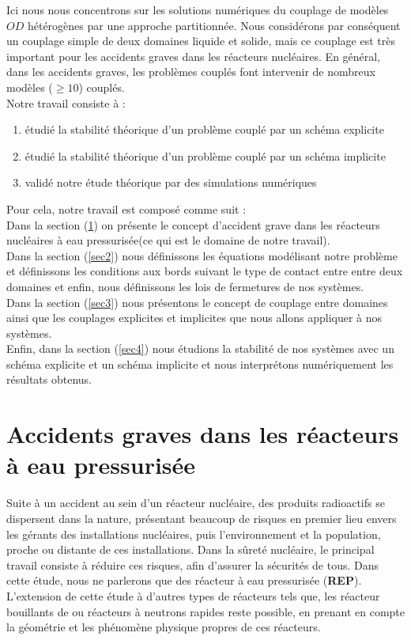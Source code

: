 \documentclass[11pt,a4paper]{scrartcl}%
\begin{document}
	Ici nous nous concentrons sur les solutions numériques du couplage de modèles $OD$ hétérogènes par une approche partitionnée.  Nous considérons par conséquent un couplage simple de deux domaines liquide et solide, mais ce couplage est très important pour les accidents graves dans les réacteurs nucléaires. En général, dans les accidents graves, les problèmes couplés font intervenir de nombreux modèles ($\geq 10$) couplés.\\
	Notre travail consiste à :
	\begin{enumerate}
		\item étudié la stabilité théorique d'un problème couplé par un schéma explicite
		\item étudié la stabilité théorique d'un problème couplé par un schéma implicite
		\item validé notre étude théorique par des simulations numériques
	\end{enumerate}
	Pour cela, notre travail est composé comme suit :\\
	Dans la section (\ref{sec1}) on présente le concept d'accident grave dans les réacteurs nucléaires à eau pressurisée(ce qui est le domaine de notre travail). \\
	Dans la section (\ref{sec2}) nous définissons les équations modélisant notre problème et définissons les conditions aux bords suivant le type de contact entre entre deux domaines et enfin, nous définissons les lois de fermetures de nos systèmes.\\
	Dans la section (\ref{sec3}) nous présentons le concept de couplage entre domaines ainsi que les couplages explicites et implicites que nous allons appliquer à nos systèmes.\\
	Enfin, dans la section (\ref{sec4}) nous étudions la stabilité de nos systèmes avec un schéma explicite et un schéma implicite et nous interprétons numériquement les résultats obtenus.
	\newpage
	\section{Accidents graves dans les réacteurs à eau pressurisée}\label{sec1}
	Suite à un accident au sein d'un réacteur nucléaire, des produits radioactifs se dispersent dans la nature, présentant beaucoup de risques en premier lieu envers les gérants des installations nucléaires, puis l'environnement et la population, proche ou distante de ces installations.
	Dans la sûreté nucléaire, le principal travail consiste à réduire ces risques, afin d'assurer la sécurités de tous. Dans cette étude, nous ne parlerons que des réacteur à eau pressurisée (\textbf{REP}). L'extension de cette étude à d'autres types de réacteurs tels que, les réacteur bouillants de  ou réacteurs à neutrons rapides reste possible, en prenant en compte la géométrie et les phénomène physique propres de ces réacteurs. 
\end{document}
